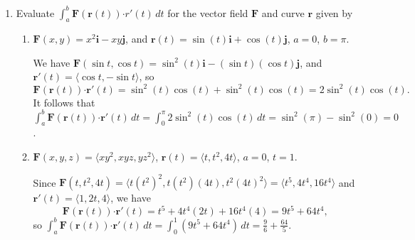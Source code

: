\documentclass[letterpaper,12pt]{article}
\renewcommand{\i}{\mathbf{i}}
\renewcommand{\j}{\mathbf{j}}
\newcommand{\di}{\displaystyle}
\renewcommand{\r}{\mathbf{r}}
\newcommand{\dotp}{\boldsymbol{\cdot}}
\newcommand{\F}{\mathbf{F}}
\begin{document}
\begin{enumerate}
 \item Evaluate $\di \int_a^b \F(\r(t))\dotp r'(t)\,dt$ for the vector field $\F$ and curve $\r$ given by
\begin{enumerate}
 \item $\F(x,y) = x^2\i -xy\j$, and $\r(t) = \sin(t)\i+\cos(t)\j$, $a=0$, $b=\pi$.

\bigskip

We have $\F(\sin t, \cos t) = \sin^2(t)\i-(\sin t)(\cos t)\j$, and $\r'(t) = \langle \cos t, -\sin t\rangle$, so 
\[
 \F(\r(t))\dotp \r'(t) = \sin^2(t)\cos (t) + \sin^2(t)\cos(t) = 2\sin^2(t)\cos(t).
\]
It follows that $\int_a^b \F(\r(t))\dotp \r'(t)\,dt = \int_0^\pi 2\sin^2(t)\cos(t)\,dt = \sin^2(\pi)-\sin^2(0)=0$. 

 \item $\F(x,y,z) = \langle xy^2, xyz, yz^2\rangle$, $\r(t) = \langle t, t^2, 4t\rangle$, $a=0$, $t=1$.

\bigskip

Since $\F(t,t^2, 4t) = \langle t(t^2)^2, t(t^2)(4t), t^2(4t)^2\rangle = \langle t^5, 4t^4, 16t^4\rangle$ and $\r'(t) = \langle 1, 2t, 4\rangle$, we have
\[
 \F(\r(t))\dotp \r'(t) = t^5+4t^4(2t)+16t^4(4) = 9t^5+64t^4,
\]
so $\int_a^b \F(\r(t))\dotp\r'(t)\,dt = \int_0^1(9t^5+64t^4)\,dt = \frac{9}{6}+\frac{64}{5}$.
\end{enumerate}


 \end{enumerate}
\end{document}
